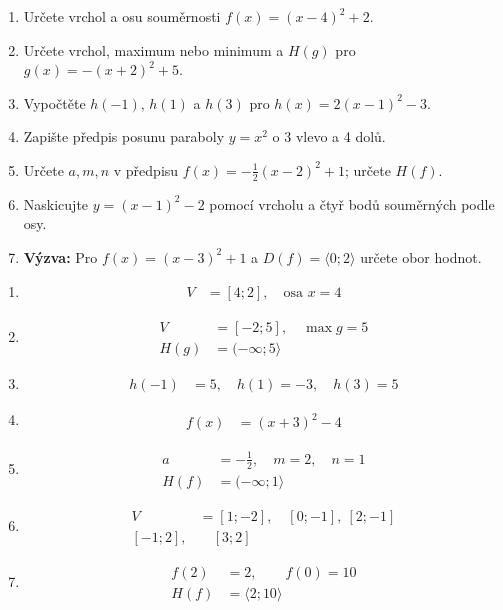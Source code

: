 \documentclass[11pt,a4paper]{article}
\begin{document}
\begin{zadaniReseniBox}[title={Domácí úkol}]
\begin{enumerate}[label=\alph*),itemsep=3pt]
\item Určete vrchol a osu souměrnosti $f(x)=(x-4)^2+2$.
\item Určete vrchol, maximum nebo minimum a $H(g)$ pro $g(x)=-(x+2)^2+5$.
\item Vypočtěte $h(-1)$, $h(1)$ a $h(3)$ pro $h(x)=2(x-1)^2-3$.
\item Zapište předpis posunu paraboly $y=x^2$ o 3 vlevo a 4 dolů.
\item Určete $a,m,n$ v předpisu $f(x)=-\frac12(x-2)^2+1$; určete $H(f)$.
\item Naskicujte $y=(x-1)^2-2$ pomocí vrcholu a čtyř bodů souměrných podle osy.
\item \textbf{Výzva:} Pro $f(x)=(x-3)^2+1$ a $D(f)=\langle0;2\rangle$ určete obor hodnot.
\end{enumerate}
\tcblower
\begin{enumerate}[label=\alph*),itemsep=4pt]
\item
\[
\begin{aligned}
V&=[4;2],\quad\text{osa }x=4
\end{aligned}
\]

\item
\[
\begin{aligned}
V&=[-2;5],\quad\max g=5 \\
H(g)&=(-\infty;5\rangle
\end{aligned}
\]

\item
\[
\begin{aligned}
h(-1)&=5,\quad h(1)=-3,\quad h(3)=5
\end{aligned}
\]

\item
\[
\begin{aligned}
f(x)&=(x+3)^2-4
\end{aligned}
\]

\item
\[
\begin{aligned}
a&=-\tfrac12,\quad m=2,\quad n=1 \\
H(f)&=(-\infty;1\rangle
\end{aligned}
\]

\item
\[
\begin{aligned}
V&=[1;-2],\quad [0;-1],\ [2;-1] \\
[-1;2],&\quad[3;2]
\end{aligned}
\]

\item
\[
\begin{aligned}
f(2)&=2,\qquad f(0)=10 \\
H(f)&=\langle2;10\rangle
\end{aligned}
\]

\end{enumerate}
\end{zadaniReseniBox}
\end{document}
